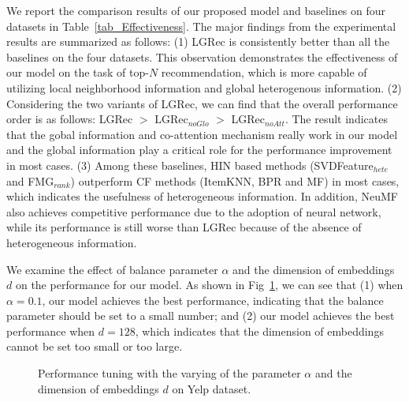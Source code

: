 We report the comparison results of our proposed model and baselines on four datasets in Table~\ref{tab_Effectiveness}. The major findings from the experimental results are summarized as follows: (1) LGRec is consistently better than all the baselines on the four datasets. This observation demonstrates the effectiveness of our model on the task of top-$N$ recommendation, which is more capable of utilizing local neighborhood information and global heterogenous information. (2) Considering the two variants of LGRec, we can find that the overall performance order is as follows: LGRec $>$ LGRec$_{noGlo}$ $>$ LGRec$_{noAtt}$. The result indicates that the gobal information and co-attention mechanism really work in our model and the global information play a critical role for the performance improvement in most cases. (3) Among these baselines, HIN based methods (SVDFeature$_{hete}$ and FMG$_{rank}$) outperform CF methods (ItemKNN, BPR and MF) in most cases, which indicates the usefulness of heterogeneous information. %
In addition, NeuMF also  achieves competitive performance due to the adoption of neural network, while its performance is still worse than LGRec because of the absence of heterogeneous information.

We examine the effect of balance parameter $\alpha$ and the dimension of embeddings $d$ on the performance for our model. As shown in Fig~\ref{fig-para}, we can see that (1) when $\alpha = 0.1$, our model achieves the best performance, indicating that the balance parameter should be set to a small number; and (2) our model achieves the best performance when $d = 128$, which indicates that the dimension of embeddings cannot be set too small or too large.

\begin{figure}[htbp]
\centering
{}
\caption{Performance tuning with the varying of the parameter $\alpha$ and the dimension of embeddings $d$ on Yelp dataset.\label{fig-para}}
\end{figure}
